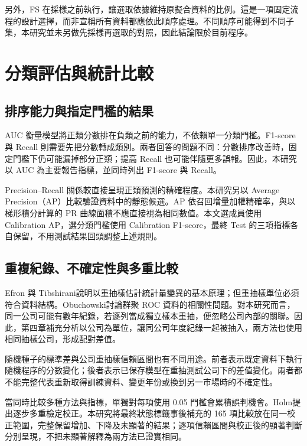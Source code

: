另外，FS 在採樣之前執行，讓選取依據維持原擬合資料的比例。這是一項固定流程的設計選擇，而非宣稱所有資料都應依此順序處理。不同順序可能得到不同子集，本研究並未另做先採樣再選取的對照，因此結論限於目前程序。

\section{分類評估與統計比較}

\subsection{排序能力與指定門檻的結果}

AUC 衡量模型將正類分數排在負類之前的能力，不依賴單一分類門檻。F1-score 與 Recall 則需要先把分數轉成類別。兩者回答的問題不同：分數排序改善時，固定門檻下仍可能漏掉部分正類；提高 Recall 也可能伴隨更多誤報。因此，本研究以 AUC 為主要報告指標，並同時列出 F1-score 與 Recall。

Precision--Recall 關係較直接呈現正類預測的精確程度\autocite{saito2015pr}。本研究另以 Average Precision（AP）比較驗證資料中的靜態候選。AP 依召回增量加權精確率，與以梯形積分計算的 PR 曲線面積不應直接視為相同數值\autocite{sklearn-ap-docs}。本文選成員使用 Calibration AP，選分類門檻使用 Calibration F1-score，最終 Test 的三項指標各自保留，不用測試結果回頭調整上述規則。

\subsection{重複紀錄、不確定性與多重比較}

Efron 與 Tibshirani\autocite{efron1986bootstrap}說明以重抽樣估計統計量變異的基本原理；但重抽樣單位必須符合資料結構。Obuchowski\autocite{obuchowski1997clustered}討論群聚 ROC 資料的相關性問題。對本研究而言，同一公司可能有數年紀錄，若逐列當成獨立樣本重抽，便忽略公司內部的關聯。因此，第四章補充分析以公司為單位，讓同公司年度紀錄一起被抽入，兩方法也使用相同抽樣公司，形成配對差值。

隨機種子的標準差與公司重抽樣信賴區間也有不同用途。前者表示既定資料下執行隨機程序的分數變化；後者表示已保存模型在重抽測試公司下的差值變化。兩者都不能完整代表重新取得訓練資料、變更年份或換到另一市場時的不確定性。

當同時比較多種方法與指標，單獨對每項使用 0.05 門檻會累積誤判機會。Holm\autocite{holm1979multiple}提出逐步多重檢定校正。本研究將最終狀態標籤事後補充的 165 項比較放在同一校正範圍，完整保留增加、下降及未顯著的結果；逐項信賴區間與校正後的顯著判斷分別呈現，不把未顯著解釋為兩方法已證實相同。

